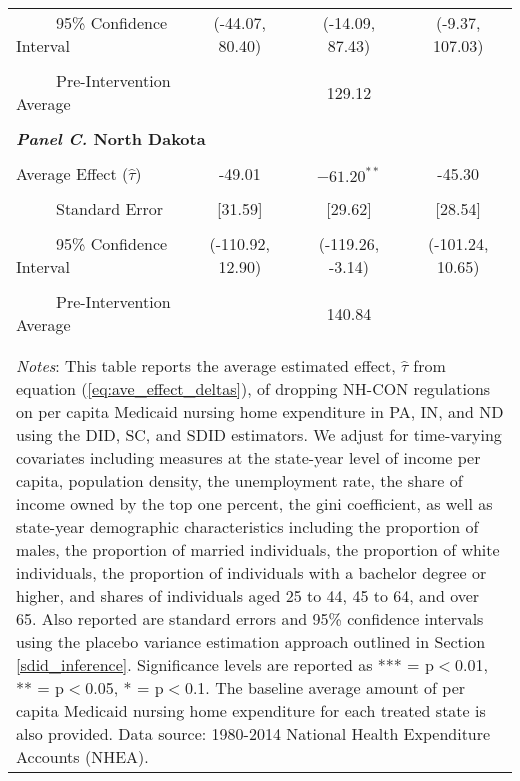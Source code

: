 \documentclass[12pt]{article}
\begin{document}
\begin{table}[htbp]
\begin{tabular}{l*{3}{c}}
\\[-2ex]
\multicolumn{1}{l}{\ \ \ \ \ 95\% Confidence Interval}&   \multicolumn{1}{c}{(-44.07, 80.40)}&   \multicolumn{1}{c}{(-14.09, 87.43)}&   \multicolumn{1}{c}{(-9.37, 107.03)}\\
\\[-2ex]
\multicolumn{1}{l}{\ \ \ \ \ Pre-Intervention Average}&   \multicolumn{3}{c}{129.12}\\
\\[-.1ex]
\multicolumn{4}{l}{\textbf{\textit{Panel C.} North Dakota}}\\
\\[-1.5ex]
\multicolumn{1}{l}{Average Effect ($\hat{\tau}$)}&   \multicolumn{1}{c}{-49.01} &   \multicolumn{1}{c}{$-61.20^{**}$}&  \multicolumn{1}{c}{-45.30}\\
\\[-2ex]
\multicolumn{1}{l}{\ \ \ \ \ Standard Error}  &\multicolumn{1}{c}{[31.59]}&\multicolumn{1}{c}{[29.62]}&\multicolumn{1}{c}{[28.54]}\\
\\[-2ex]
\multicolumn{1}{l}{\ \ \ \ \ 95\% Confidence Interval}&   \multicolumn{1}{c}{(-110.92, 12.90)}&   \multicolumn{1}{c}{(-119.26, -3.14)}&   \multicolumn{1}{c}{(-101.24, 10.65)}\\
\\[-2ex]
\multicolumn{1}{l}{\ \ \ \ \ Pre-Intervention Average}&   \multicolumn{3}{c}{140.84}\\
\\[-.1ex]
\hline\hline
\\[-2ex]
\multicolumn{4}{p{.8\linewidth}}{\footnotesize \textit{Notes}: This table reports the average estimated effect, $\hat{\tau}$ from equation (\ref{eq:ave_effect_deltas}), of dropping NH-CON regulations on per capita Medicaid nursing home expenditure in PA, IN, and ND using the DID, SC, and SDID estimators. We adjust for time-varying covariates including measures at the state-year level of income per capita, population density, the unemployment rate, the share of income owned by the top one percent, the gini coefficient, as well as state-year demographic characteristics including the proportion of males, the proportion of married individuals, the proportion of white individuals, the proportion of individuals with a bachelor degree or higher, and shares of individuals aged 25 to 44, 45 to 64, and over 65. Also reported are standard errors and 95\% confidence intervals using the placebo variance estimation approach outlined in Section \ref{sdid_inference}. Significance levels are reported as *** = p$<$0.01, ** = p$<$0.05, * = p$<$0.1. The baseline average amount of per capita Medicaid nursing home expenditure for each treated state is also provided. Data source: 1980-2014 National Health Expenditure Accounts (NHEA).}
\end{tabular}
\end{table}
\vfill
\end{document}
